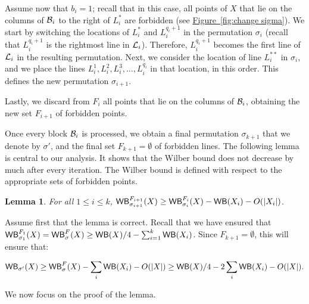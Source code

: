 \documentclass[11pt]{article}
\numberwithin{equation}{section}
\newtheorem{lemma}[theorem]{Lemma}
\theoremstyle{definition}
\theoremstyle{plain}
\newcommand{\expref}[2]{\hyperref[#2]{#1~\ref{#2}}}
\begin{document}
Assume now that $b_i=1$;  recall that in this case, all points of $X$ that lie on the columns of ${\mathcal{B}}_i$ to the right of $L^*_i$ are forbidden  (see \expref{Figure}{fig:change sigma}). We start by switching the locations of $L^*_i$ and $L_i^{q_i+1}$ in the permutation $\sigma_i$ (recall that $L_i^{q_i+1}$ is the rightmost line in ${\mathcal L}_i$). Therefore, $L_i^{q_i+1}$ becomes the first line of ${\mathcal L}_i$ in the resulting permutation. Next, we
consider the location of line $L^{**}_i$ in $\sigma_i$, and we place the lines $L_i^1,L_i^2,L_i^3,\ldots,L_i^{q_i}$ in that location, in this order. This defines the new permutation $\sigma_{i+1}$.

Lastly, we discard from $F_i$ all points that lie on the columns of ${\mathcal{B}}_i$, obtaining the new set $F_{i+1}$ of forbidden points.

Once every block ${\mathcal{B}}_i$ is processed, we obtain a final permutation $\sigma_{k+1}$ that we denote by $\sigma'$, and the final set $F_{k+1}=\emptyset$ of forbidden lines. The following lemma is central to our analysis. It shows that the Wilber bound does not decrease by much after every iteration. The Wilber bound is defined with respect to the appropriate sets of forbidden points.


\begin{lemma}\label{lemma: small change}
	For all $1\leq i\leq k$,  $\mathsf{WB}^{F_{i+1}}_{\sigma_{i+1}}(X)\geq \mathsf{WB}^{F_i}_{\sigma_i}(X)-\mathsf{WB}(X_i)-O(|X_i|)$.
\end{lemma}

Assume first that the lemma is correct. Recall that we have ensured that $\mathsf{WB}^{F_1}_{\sigma_1}(X)=\mathsf{WB}^F_{\sigma}(X)\geq \mathsf{WB}(X)/4-\sum_{i=1}^k\mathsf{WB}(X_i)$. Since $F_{k+1}=\emptyset$, this will ensure that:

\[\mathsf{WB}_{\sigma'}(X)\geq \mathsf{WB}^F_{\sigma}(X)-\sum_i\mathsf{WB}(X_i)-O(|X|)\geq \mathsf{WB}(X)/4-2\sum_i \mathsf{WB}(X_i)-O(|X|).\]

We now focus on the proof of the lemma.
\end{document}
